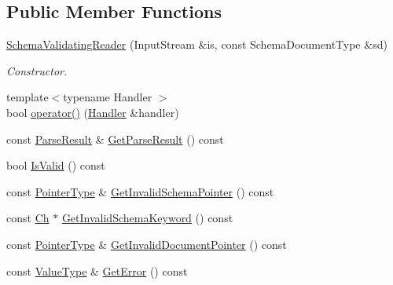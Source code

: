 \subsection*{Public Member Functions}
\begin{DoxyCompactItemize}
\item 
\mbox{\hyperlink{classrapidjson_1_1_schema_validating_reader_a1e2bcc66cad23376241cd91e8bf8c706}{Schema\+Validating\+Reader}} (Input\+Stream \&is, const Schema\+Document\+Type \&sd)
\begin{DoxyCompactList}\small\item\em Constructor. \end{DoxyCompactList}\item 
{\footnotesize template$<$typename Handler $>$ }\\bool \mbox{\hyperlink{classrapidjson_1_1_schema_validating_reader_adb09230cc40b8dc5ba607de14d37dc42}{operator()}} (\mbox{\hyperlink{classrapidjson_1_1_handler}{Handler}} \&handler)
\item 
const \mbox{\hyperlink{structrapidjson_1_1_parse_result}{Parse\+Result}} \& \mbox{\hyperlink{classrapidjson_1_1_schema_validating_reader_a957147a03ad791aa12a0552320371a41}{Get\+Parse\+Result}} () const
\item 
bool \mbox{\hyperlink{classrapidjson_1_1_schema_validating_reader_a803e1eff3f4fa021e56c6583c45c9fb4}{Is\+Valid}} () const
\item 
const \mbox{\hyperlink{classrapidjson_1_1_schema_validating_reader_a42c64d1ed25ffb2e70a35b9e43e0e564}{Pointer\+Type}} \& \mbox{\hyperlink{classrapidjson_1_1_schema_validating_reader_ae90052ccece8e04e7a840dd61f7ac83c}{Get\+Invalid\+Schema\+Pointer}} () const
\item 
const \mbox{\hyperlink{classrapidjson_1_1_schema_validating_reader_a3507a4886ce6778fe1cae39ed5f0baaf}{Ch}} $\ast$ \mbox{\hyperlink{classrapidjson_1_1_schema_validating_reader_a67bf36f1e4bf24a0760170ed199f592b}{Get\+Invalid\+Schema\+Keyword}} () const
\item 
const \mbox{\hyperlink{classrapidjson_1_1_schema_validating_reader_a42c64d1ed25ffb2e70a35b9e43e0e564}{Pointer\+Type}} \& \mbox{\hyperlink{classrapidjson_1_1_schema_validating_reader_a00e8db597e8a55b5f8810707dda40dfa}{Get\+Invalid\+Document\+Pointer}} () const
\item 
const \mbox{\hyperlink{classrapidjson_1_1_schema_validating_reader_a6fb634fa68daaa8c185136258042f4c6}{Value\+Type}} \& \mbox{\hyperlink{classrapidjson_1_1_schema_validating_reader_a296167ce6eb968797de22a671311c4a5}{Get\+Error}} () const
\end{DoxyCompactItemize}
